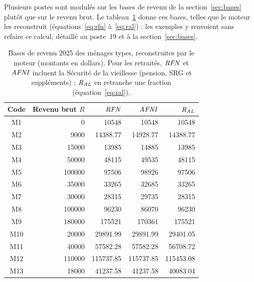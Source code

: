 Plusieurs postes sont modulés sur les bases de revenu de la
section~\ref{sec:bases} plutôt que sur le revenu brut. Le
tableau~\ref{tab:bases-exemples} donne ces bases, telles que le moteur les
reconstruit (équations~\eqref{eq:rfn} à~\eqref{eq:ral}) : les exemples y
renvoient sans refaire ce calcul, détaillé au poste~19 et à la
section~\ref{sec:bases}.

\begin{table}[ht]
\centering
\small
\begin{tabular}{c r r r r}
\toprule
Code & Revenu brut $R$ & $\mathit{RFN}$ & $\mathit{AFNI}$ & $\mathit{R_{AL}}$ \\
\midrule
M1 & \num{0} & \num{10548} & \num{10548} & \num{10548} \\
M2 & \num{9000} & \num{14388.77} & \num{14928.77} & \num{14388.77} \\
M3 & \num{15000} & \num{13985} & \num{14885} & \num{13985} \\
M4 & \num{50000} & \num{48115} & \num{49535} & \num{48115} \\
M5 & \num{100000} & \num{97506} & \num{98926} & \num{97506} \\
M6 & \num{35000} & \num{33265} & \num{32685} & \num{33265} \\
M7 & \num{30000} & \num{28315} & \num{29735} & \num{28315} \\
M8 & \num{100000} & \num{96230} & \num{86070} & \num{96230} \\
M9 & \num{180000} & \num{175521} & \num{170361} & \num{175521} \\
M10 & \num{20000} & \num{29891.99} & \num{29891.99} & \num{29401.05} \\
M11 & \num{40000} & \num{57582.28} & \num{57582.28} & \num{56708.72} \\
M12 & \num{110000} & \num{115737.85} & \num{115737.85} & \num{115453.08} \\
M13 & \num{18000} & \num{41237.58} & \num{41237.58} & \num{40083.04} \\
\bottomrule
\end{tabular}
\caption{Bases de revenu 2025 des ménages types, reconstruites par le moteur
(montants en dollars). Pour les retraités, $\mathit{RFN}$ et $\mathit{AFNI}$ incluent la
Sécurité de la vieillesse (pension, SRG et suppléments) ; $\mathit{R_{AL}}$ en retranche
une fraction (équation~\eqref{eq:ral}).}
\label{tab:bases-exemples}
\end{table}
